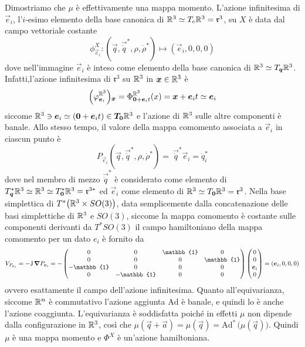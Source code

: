 Dimostriamo che $\mu$ è effettivamente una mappa momento. L'azione infinitesima di $\vec{e}_i$, l'$i$-esimo elemento della base canonica di $\mathbb{R}^3 \simeq T_e \mathbb{R}^3 = \mathfrak{r}^3$, su $X$ è data dal campo vettoriale costante
\begin{equation}
\phi_{\vec{e}_i}^X: (\vec{q},\vec{\dot{q}}^*, \rho, \dot{\rho}^*)\longmapsto (\vec{e}_i, 0, 0, 0)
\end{equation}
dove nell'immagine $\vec{e}_i$ è inteso come elemento della base canonica di $\mathbb{R}^3 \simeq T_{\boldsymbol{q}}\mathbb{R}^3$. Infatti,l'azione infinitesima di $\mathfrak{r}^3$ su $\mathbb{R}^3$ in $\boldsymbol{x} \in \mathbb{R}^3$ è \begin{equation}
  \Big(\varphi^{\mathbb{R}^3}_{\boldsymbol{e}_i}\Big)\boldsymbol{_x} = \Phi^{\mathbb{R}^3}_{\boldsymbol{0} + \boldsymbol{e}_i t}(x) = \boldsymbol{x} + \boldsymbol{e}_i t \simeq \boldsymbol{e}_i
\end{equation}
siccome $\mathbb{R}^3 \ni \boldsymbol{e}_i \simeq (\boldsymbol{0}+\boldsymbol{e}_i t) \in \boldsymbol{T_0} \mathbb{R}^3 $ e l'azione di $\mathbb{R}^3$ sulle altre componenti è banale. Allo stesso tempo, il valore della mappa comomento associata a $\vec{e}_i$ in ciascun punto è 
\begin{equation}
  P_{\vec{e}_i}(\vec{q},\vec{\dot{q}}^*, \rho, \dot{\rho}^*) =\ \vec{\dot{q}}^*\! \vec{e}_i = \dot{q}^*_i
\end{equation} 
dove nel membro di mezzo $\vec{\dot{q}}^*$ è considerato come elemento di $T^*_{\boldsymbol{q}}\mathbb{R}^3 \simeq \mathbb{R}^3 \simeq T^*_{\boldsymbol{0}}\mathbb{R}^3 = \mathfrak{r}^{3*}$ ed $\vec{e}_i$ come elemento di $\mathbb{R}^3 \simeq T_{\boldsymbol{0}}\mathbb{R}^3 = \mathfrak{r}^3$. Nella base simplettica di $T^*\big(\mathbb{R}^3 \times  SO(3)\big)$, data semplicemente dalla concatenazione delle basi simplettiche di $\mathbb{R}^3$ e $SO(3)$, siccome la mappa comomento è costante sulle componenti derivanti da $T^*SO(3)$ il campo hamiltoniano della mappa comomento per un dato $e_i$ è fornito da \begin{equation}
V_{P_{\vec{e}_i}} = - \mathsf{J}\, \grad{P_{\vec{e}_i}} = - \begin{pmatrix}
  0 & 0 & \mathbb{1} & 0 \\
  0 & 0 & 0 & \mathbb{1} \\
  -\mathbb{1} & 0 & 0 & 0 \\ 
  0 & -\mathbb{1} & 0 & 0 
\end{pmatrix} \begin{pmatrix}
0 \\ 0 \\ \vec{e}_i \\ 0
\end{pmatrix} = (\vec{e}_i, 0, 0, 0)
\end{equation} 
ovvero esattamente il campo dell'azione infinitesima. Quanto all'equivarianza, siccome $\mathbb{R}^{n}$ è commutativo l'azione aggiunta $\mathrm{Ad}$ è banale, e quindi lo è anche l'azione coaggiunta. L'equivarianza è soddisfatta poiché in effetti $\mu$ non dipende dalla configurazione in $\mathbb{R}^3$, così che $\mu(\vec{q}+\vec{a}) = \mu(\vec{q}) = \mathrm{Ad}^*\,\big(\mu(\vec{q})\big)$. Quindi $\mu$ è una mappa momento e $\Phi^X$ è un'azione hamiltoniana.

